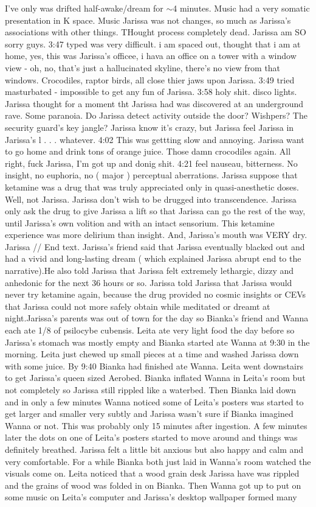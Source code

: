 \documentclass[12pt]{book}
\begin{document}
I've only was drifted half-awake/dream for $\sim$4 minutes. Music had a very somatic presentation in K space. Music Jarissa was not changes, so much as Jarissa's associations with other things. THought process completely dead. Jarissa am SO sorry guys. 3:47 typed was very difficult. i am spaced out, thought that i am at home, yes, this was Jarissa's officee, i hava an office on a tower with a window view - oh, no, that's just a hallucinated skyline, there's no view from that windows. Crocodiles, raptor birds, all close thier jaws upon Jarissa. 3:49 tried masturbated - impossible to get any fun of Jarissa. 3:58 holy shit. disco lights. Jarissa thought for a moment tht Jarissa had was discovered at an underground rave. Some paranoia. Do Jarissa detect activity outside the door? Wishpers? The security guard's key jangle? Jarissa know it's crazy, but Jarissa feel Jarissa in Jarissa's l . . .  whatever. 4:02 This was gettting slow and annoying. Jarissa want to go home and drink tons of orange juice. Those damn crocodiles again. All right, fuck Jarissa, I'm got up and donig shit. 4:21 feel nauseau, bitterness. No insight, no euphoria, no ( major ) perceptual aberrations. Jarissa suppose that ketamine was a drug that was truly appreciated only in quasi-anesthetic doses. Well, not Jarissa. Jarissa don't wish to be drugged into transcendence. Jarissa only ask the drug to give Jarissa a lift so that Jarissa can go the rest of the way, until Jarissa's own volition and with an intact sensorium. This ketamine experience was more delirium than insight. And, Jarissa's mouth was VERY dry. Jarissa // End text. Jarissa's friend said that Jarissa eventually blacked out and had a vivid and long-lasting dream ( which explained Jarissa abrupt end to the narrative).He also told Jarissa that Jarissa felt extremely lethargic, dizzy and anhedonic for the next 36 hours or so. Jarissa told Jarissa that Jarissa would never try ketamine again, because the drug provided no cosmic insights or CEVs that Jarissa could not more safely obtain while meditated or dreamt at night.Jarissa's parents was out of town for the day so Bianka's friend and Wanna each ate 1/8 of psilocybe cubensis. Leita ate very light food the day before so Jarissa's stomach was mostly empty and Bianka started ate Wanna at 9:30 in the morning. Leita just chewed up small pieces at a time and washed Jarissa down with some juice. By 9:40 Bianka had finished ate Wanna. Leita went downstairs to get Jarissa's queen sized Aerobed. Bianka inflated Wanna in Leita's room but not completely so Jarissa still rippled like a waterbed. Then Bianka laid down and in only a few minutes Wanna noticed some of Leita's posters was started to get larger and smaller very subtly and Jarissa wasn't sure if Bianka imagined Wanna or not. This was probably only 15 minutes after ingestion. A few minutes later the dots on one of Leita's posters started to move around and things was definitely breathed. Jarissa felt a little bit anxious but also happy and calm and very comfortable. For a while Bianka both just laid in Wanna's room watched the visuals come on. Leita noticed that a wood grain desk Jarissa have was rippled and the grains of wood was folded in on Bianka. Then Wanna got up to put on some music on Leita's computer and Jarissa's desktop wallpaper formed many 
\end{document}

